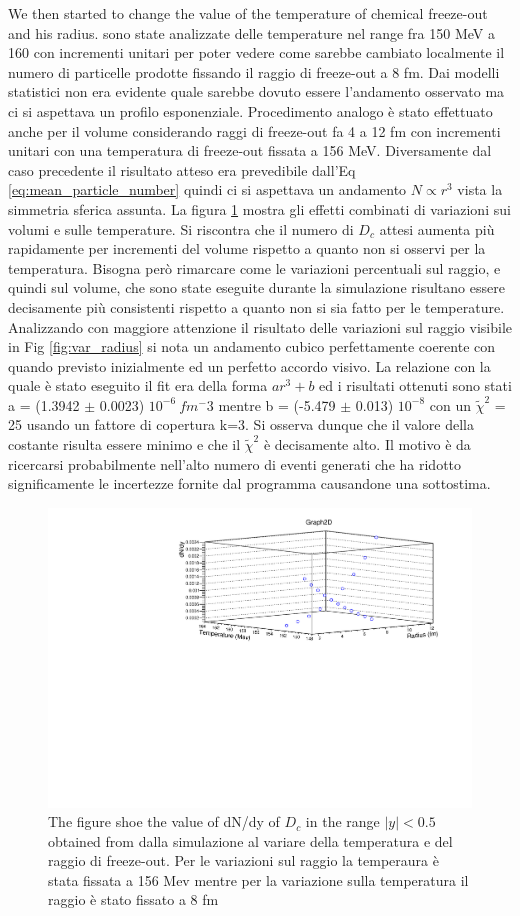 \documentclass[12pt,a4paper]{book}
\begin{document}
	We then started to change the value of the temperature of chemical freeze-out and his radius. sono state analizzate delle temperature nel range fra 150 MeV a 160 con incrementi unitari per poter vedere come sarebbe cambiato localmente il numero di particelle prodotte fissando il raggio di freeze-out a 8 fm. Dai modelli statistici non era evidente quale sarebbe dovuto essere l'andamento osservato ma ci si aspettava un profilo esponenziale. Procedimento analogo è stato effettuato anche per il volume considerando raggi di freeze-out fa 4 a 12 fm con incrementi unitari con una temperatura di freeze-out fissata a 156 MeV. Diversamente dal caso precedente il risultato atteso era prevedibile dall'Eq \ref{eq:mean_particle_number} quindi ci si aspettava un andamento $N \propto r^3$ vista la simmetria sferica assunta. La figura \ref{fig:2dgraph} mostra gli effetti combinati di variazioni sui volumi e sulle temperature. Si riscontra che il numero di $D_c$ attesi aumenta più rapidamente per incrementi del volume rispetto a quanto non si osservi per la temperatura. Bisogna però rimarcare come le variazioni percentuali sul raggio, e quindi sul volume, che sono state eseguite durante la simulazione risultano essere decisamente più consistenti rispetto a quanto non si sia fatto per le temperature. Analizzando con maggiore attenzione il risultato delle variazioni sul raggio visibile in Fig \ref{fig:var_radius} si nota un andamento cubico perfettamente coerente con quando previsto inizialmente ed un perfetto accordo visivo. La relazione con la quale è stato eseguito il fit era della forma $a r^3 +b$ ed i risultati ottenuti sono stati a = (1.3942 $\pm$ 0.0023) $10^{-6} \ fm^-3$ mentre b = (-5.479 $\pm$ 0.013) $10^{-8}$ con un $\tilde{\chi}^2$ = 25 usando un fattore di copertura k=3. Si osserva dunque che il valore della costante risulta essere minimo e che il $\tilde{\chi}^2$ è decisamente alto. Il motivo è da ricercarsi probabilmente nell'alto numero di eventi generati che ha ridotto significamente le incertezze fornite dal programma causandone una sottostima. 
	\begin{figure}
			\includegraphics[width=0.8 \linewidth]{pictures/2dgraph.pdf}
		\caption{The figure shoe the value of dN/dy of $D_c$ in the range $|y|<0.5$ obtained from dalla simulazione al variare della temperatura e del raggio di freeze-out. Per le variazioni sul raggio la temperaura è stata fissata a 156 Mev mentre per la variazione sulla temperatura il raggio è stato fissato a 8 fm}
		\label{fig:2dgraph}
	\end{figure}
	
\end{document}
